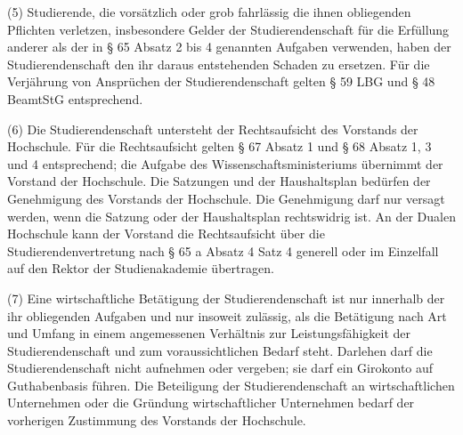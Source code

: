 \documentclass[
10pt,
a4paper,
twoside,								%
titlepage=false,							%
draft=false								%
]{scrartcl}
\begin{document}
(5) Studierende, die vorsätzlich oder grob fahrlässig die ihnen obliegenden Pflichten verletzen, insbesondere Gelder der Studierendenschaft für die Erfüllung anderer als der in § 65 Absatz 2 bis 4 genannten Aufgaben verwenden, haben der Studierendenschaft den ihr daraus entstehenden Schaden zu ersetzen. Für die Verjährung von Ansprüchen der Studierendenschaft gelten § 59 LBG und § 48 BeamtStG entsprechend.

(6) Die Studierendenschaft untersteht der Rechtsaufsicht des Vorstands der Hochschule. Für die Rechtsaufsicht gelten § 67 Absatz 1 und § 68 Absatz 1, 3 und 4 entsprechend; die Aufgabe des Wissenschaftsministeriums übernimmt der Vorstand der Hochschule. Die Satzungen und der Haushaltsplan bedürfen der Genehmigung des Vorstands der Hochschule. Die Genehmigung darf nur versagt werden, wenn die Satzung oder der Haushaltsplan rechtswidrig ist. An der Dualen Hochschule kann der Vorstand die Rechtsaufsicht über die Studierendenvertretung nach § 65 a Absatz 4 Satz 4 generell oder im Einzelfall auf den Rektor der Studienakademie übertragen.

(7) Eine wirtschaftliche Betätigung der Studierendenschaft ist nur innerhalb der ihr obliegenden Aufgaben und nur insoweit zulässig, als die Betätigung nach Art und Umfang in einem angemessenen Verhältnis zur Leistungsfähigkeit der Studierendenschaft und zum voraussichtlichen Bedarf steht. Darlehen darf die Studierendenschaft nicht aufnehmen oder vergeben; sie darf ein Girokonto auf Guthabenbasis führen. Die Beteiligung der Studierendenschaft an wirtschaftlichen Unternehmen oder die Gründung wirtschaftlicher Unternehmen bedarf der vorherigen Zustimmung des Vorstands der Hochschule.


\end{document}
